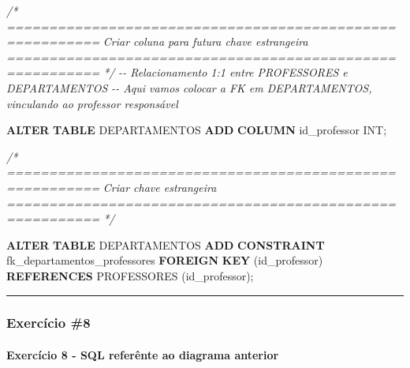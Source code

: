 \documentclass[
]{book}
\newenvironment{Shaded}{\begin{snugshade}}{\end{snugshade}}
\newcommand{\CommentTok}[1]{\textcolor[rgb]{0.56,0.35,0.01}{\textit{#1}}}
\newcommand{\DataTypeTok}[1]{\textcolor[rgb]{0.13,0.29,0.53}{#1}}
\newcommand{\KeywordTok}[1]{\textcolor[rgb]{0.13,0.29,0.53}{\textbf{#1}}}
\newcommand{\NormalTok}[1]{#1}
\begin{document}
\begin{Shaded}
\begin{Highlighting}[]
\CommentTok{/* =========================================================}
\CommentTok{   Criar coluna para futura chave estrangeira}
\CommentTok{   ========================================================= */}
\CommentTok{{-}{-} Relacionamento 1:1 entre PROFESSORES e DEPARTAMENTOS}
\CommentTok{{-}{-} Aqui vamos colocar a FK em DEPARTAMENTOS, vinculando ao professor responsável}

\KeywordTok{ALTER} \KeywordTok{TABLE}\NormalTok{ DEPARTAMENTOS }\KeywordTok{ADD} \KeywordTok{COLUMN}\NormalTok{ id\_professor }\DataTypeTok{INT}\NormalTok{;}

\CommentTok{/* =========================================================}
\CommentTok{   Criar chave estrangeira}
\CommentTok{   ========================================================= */}

\KeywordTok{ALTER} \KeywordTok{TABLE}\NormalTok{ DEPARTAMENTOS }\KeywordTok{ADD} \KeywordTok{CONSTRAINT}\NormalTok{ fk\_departamentos\_professores }\KeywordTok{FOREIGN} \KeywordTok{KEY}\NormalTok{ (id\_professor) }\KeywordTok{REFERENCES}\NormalTok{ PROFESSORES (id\_professor);}
\end{Highlighting}
\end{Shaded}

\begin{center}\rule{0.5\linewidth}{0.5pt}\end{center}

\subsubsection{Exercício \#8}\label{exercuxedcio-8}



\paragraph{Exercício 8 - SQL referênte ao diagrama anterior}\label{exercuxedcio-8---sql-referuxeante-ao-diagrama-anterior}
\end{document}
